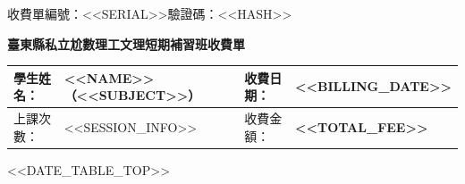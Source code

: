 \documentclass[a4paper]{article}
\newcommand{\serialNum}{<<SERIAL>>}
\newcommand{\hashCode}{<<HASH>>}
\newcommand{\studentName}{<<NAME>>}
\newcommand{\subjectName}{<<SUBJECT>>}
\newcommand{\billingDate}{<<BILLING_DATE>>}
\newcommand{\totalFee}{<<TOTAL_FEE>>}
\newcommand{\sessionInfo}{<<SESSION_INFO>>}
\begin{document}
\begin{flushright}
\small 收費單編號：\serialNum \quad 驗證碼：\hashCode
\end{flushright}

\vspace{2mm}

\begin{center}
{\LARGE\bfseries 臺東縣私立尬數理工文理短期補習班\quad 收費單}
\end{center}

\vspace{4mm}

\begin{center}
\renewcommand{\arraystretch}{1.8}
\begin{tabular}{|>{\centering\arraybackslash}m{3.2cm}|>{\centering\arraybackslash}m{4.5cm}|>{\centering\arraybackslash}m{3.2cm}|>{\centering\arraybackslash}m{4.5cm}|}
\hline
\large 學生姓名： & \large \studentName（\subjectName） & \large 收費日期： & \large \textbf{\billingDate} \\
\hline
\large 上課次數： & \large \sessionInfo & \large 收費金額： & \large \textbf{\totalFee} \\
\hline
\end{tabular}
\end{center}

\vspace{4mm}

\begin{center}
\renewcommand{\arraystretch}{2.0}
<<DATE_TABLE_TOP>>
\end{center}


\vspace{6mm}

\begin{center}
\end{center}

\vspace{4mm}

\end{document}
